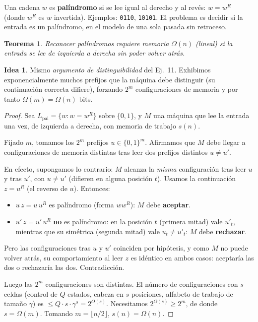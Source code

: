 \documentclass[11pt,a4paper]{article}
\theoremstyle{plain}
\newtheorem{teorema}{Teorema}
\theoremstyle{definition}
\newtheorem*{idea}{Idea}
\begin{document}
\begin{concepto}
Una cadena $w$ es \textbf{pal\'indromo} si se lee igual al derecho y al rev\'es:
$w=w^{R}$ (donde $w^R$ es $w$ invertida). Ejemplos: \texttt{0110}, \texttt{10101}. El
problema es decidir si la entrada es un pal\'indromo, en el modelo de una sola pasada
sin retroceso.
\end{concepto}

\begin{teorema}
Reconocer pal\'indromos requiere memoria $\Omega(n)$ (lineal) si la entrada se lee de
izquierda a derecha sin poder volver atr\'as.
\end{teorema}

\begin{idea}
Mismo \emph{argumento de distinguibilidad} del Ej.\ 11. Exhibimos exponencialmente
muchos prefijos que la m\'aquina debe distinguir (su continuaci\'on correcta difiere),
forzando $2^m$ configuraciones de memoria y por tanto $\Omega(m)=\Omega(n)$ bits.
\end{idea}

\begin{proof}
Sea $L_{\text{pal}}=\{w:w=w^R\}$ sobre $\{0,1\}$, y $M$ una m\'aquina que lee la
entrada una vez, de izquierda a derecha, con memoria de trabajo $s(n)$.

Fijado $m$, tomamos los $2^m$ prefijos $u\in\{0,1\}^m$. Afirmamos que $M$ debe llegar
a configuraciones de memoria distintas tras leer dos prefijos distintos $u\neq u'$.

En efecto, supongamos lo contrario: $M$ alcanza la \emph{misma} configuraci\'on tras
leer $u$ y tras $u'$, con $u\neq u'$ (difieren en alguna posici\'on $t$). Usamos la
continuaci\'on $z=u^R$ (el reverso de $u$). Entonces:
\begin{itemize}[nosep]
  \item $u\,z=u\,u^R$ es pal\'indromo (forma $w w^R$): $M$ debe \textbf{aceptar}.
  \item $u'\,z=u'\,u^R$ \textbf{no} es pal\'indromo: en la posici\'on $t$ (primera
        mitad) vale $u'_t$, mientras que su sim\'etrica (segunda mitad) vale
        $u_t\neq u'_t$: $M$ debe \textbf{rechazar}.
\end{itemize}
Pero las configuraciones tras $u$ y $u'$ coinciden por hip\'otesis, y como $M$ no
puede volver atr\'as, su comportamiento al leer $z$ es id\'entico en ambos casos:
aceptar\'ia las dos o rechazar\'ia las dos. Contradicci\'on.

Luego las $2^m$ configuraciones son distintas. El n\'umero de configuraciones con $s$
celdas (control de $Q$ estados, cabeza en $s$ posiciones, alfabeto de trabajo de
tama\~no $\gamma$) es $\le Q\cdot s\cdot \gamma^{s}=2^{O(s)}$. Necesitamos
$2^{O(s)}\ge 2^m$, de donde $s=\Omega(m)$. Tomando $m=\lfloor n/2\rfloor$,
$s(n)=\Omega(n)$.
\end{proof}
\end{document}
